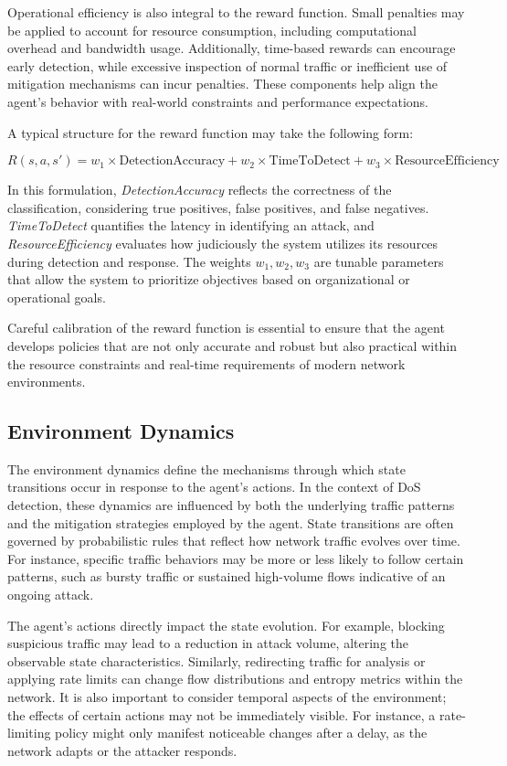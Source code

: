 \documentclass{report}
\begin{document}
Operational efficiency is also integral to the reward function. Small penalties may be applied to account for resource consumption, including computational overhead and bandwidth usage. Additionally, time-based rewards can encourage early detection, while excessive inspection of normal traffic or inefficient use of mitigation mechanisms can incur penalties. These components help align the agent’s behavior with real-world constraints and performance expectations.

A typical structure for the reward function may take the following form:

\begin{equation}
R(s, a, s') = w_{1} \times \text{DetectionAccuracy} + w_{2} \times \text{TimeToDetect} + w_{3} \times \text{ResourceEfficiency}
\end{equation}

In this formulation, \textit{DetectionAccuracy} reflects the correctness of the classification, considering true positives, false positives, and false negatives. \textit{TimeToDetect} quantifies the latency in identifying an attack, and \textit{ResourceEfficiency} evaluates how judiciously the system utilizes its resources during detection and response. The weights \(w_{1}, w_{2}, w_{3}\) are tunable parameters that allow the system to prioritize objectives based on organizational or operational goals.

Careful calibration of the reward function is essential to ensure that the agent develops policies that are not only accurate and robust but also practical within the resource constraints and real-time requirements of modern network environments.


\subsection{Environment Dynamics}

The environment dynamics define the mechanisms through which state transitions occur in response to the agent’s actions. In the context of DoS detection, these dynamics are influenced by both the underlying traffic patterns and the mitigation strategies employed by the agent. State transitions are often governed by probabilistic rules that reflect how network traffic evolves over time. For instance, specific traffic behaviors may be more or less likely to follow certain patterns, such as bursty traffic or sustained high-volume flows indicative of an ongoing attack.

The agent’s actions directly impact the state evolution. For example, blocking suspicious traffic may lead to a reduction in attack volume, altering the observable state characteristics. Similarly, redirecting traffic for analysis or applying rate limits can change flow distributions and entropy metrics within the network. It is also important to consider temporal aspects of the environment; the effects of certain actions may not be immediately visible. For instance, a rate-limiting policy might only manifest noticeable changes after a delay, as the network adapts or the attacker responds.
\end{document}
